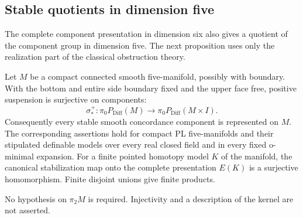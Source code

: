 \subsection{Stable quotients in dimension five}

The complete component presentation in dimension six also gives a
quotient of the component group in dimension five. The next proposition
uses only the realization part of the classical obstruction theory.

\begin{proposition}\label{prop:five-dimensional-stable-surjectivity}
Let $M$ be a compact connected smooth five-manifold, possibly with
boundary. With the bottom and entire side boundary fixed and the
upper face free, positive suspension is surjective on components:
\[
 \sigma^+_*:\pi_0P_{\mathrm{Diff}}(M)
       \longrightarrow\pi_0P_{\mathrm{Diff}}(M\times I).
\]
Consequently every stable smooth concordance component is represented
on $M$. The corresponding assertions hold for compact PL
five-manifolds and their stipulated definable models over every real
closed field and in every fixed o-minimal expansion. For a finite
pointed homotopy model $K$ of the manifold, the
canonical stabilization map onto the complete presentation $E(K)$ is
a surjective homomorphism. Finite disjoint unions give finite products.

No hypothesis on $\pi_2M$ is required. Injectivity and a description
of the kernel are not asserted.
\end{proposition}

